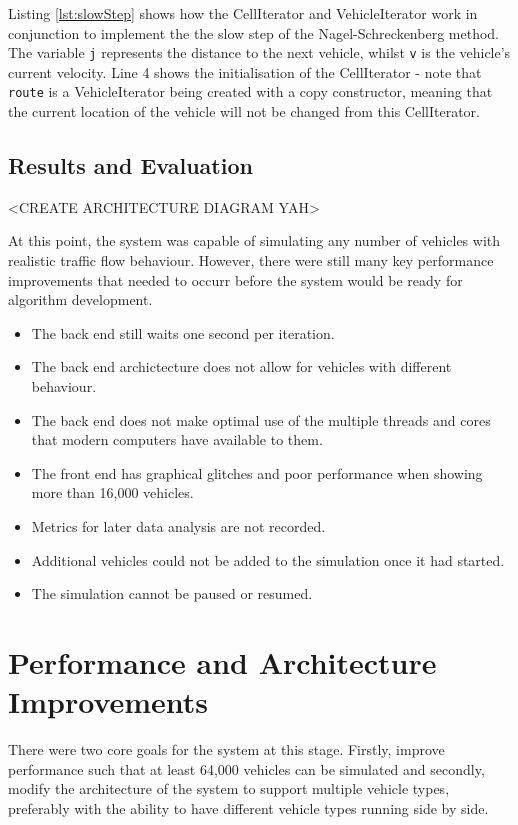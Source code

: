 \documentclass[ %
                    author={Alexander Hill},
                supervisor={Dr. Benjamin Sach},
                    degree={MEng},
                     title={MARMOSET},
                  subtitle={Multi-Agent Route Management using Online Simulation for Efficient Transportation},
                      type={research},
                      year={2016} ]{dissertation}
\begin{document}
Listing \ref{lst:slowStep} shows how the CellIterator and VehicleIterator work
in conjunction to implement the the slow step of the Nagel-Schreckenberg method.
The variable \texttt{j} represents the distance to the next vehicle, whilst
\texttt{v} is the vehicle's current velocity. Line 4 shows the initialisation
of the CellIterator - note that \texttt{route} is a VehicleIterator being
created with a copy constructor, meaning that the current location of the
vehicle will not be changed from this CellIterator.

\subsection{Results and Evaluation}

<CREATE ARCHITECTURE DIAGRAM YAH>

At this point, the system was capable of simulating any number of
vehicles with realistic traffic flow behaviour. However, there were still many
key performance improvements that needed to occurr before the system would be
ready for algorithm development.

\begin{itemize}
    \item The back end still waits one second per iteration.
    \item The back end archictecture does not allow for vehicles with different
        behaviour.
    \item The back end does not make optimal use of the multiple threads and
        cores that modern computers have available to them.
    \item The front end has graphical glitches and poor performance when
        showing more than 16,000 vehicles.
    \item Metrics for later data analysis are not recorded.
    \item Additional vehicles could not be added to the simulation once it had
        started.
    \item The simulation cannot be paused or resumed.
\end{itemize}

\section{Performance and Architecture Improvements}

There were two core goals for the system at this stage. Firstly, improve
performance such that at least 64,000 vehicles can be simulated and secondly,
modify the architecture of the system to support multiple vehicle types,
preferably with the ability to have different vehicle types running side by
side.
\end{document}
